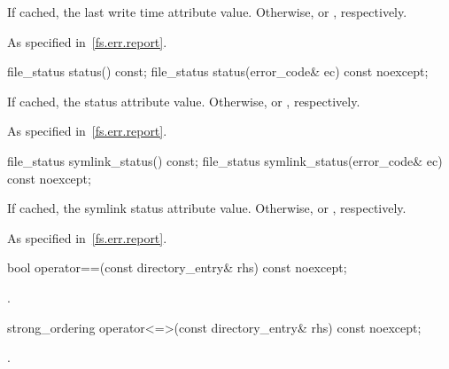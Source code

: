\begin{itemdescr}
\pnum
\returns
If cached, the last write time attribute value.
Otherwise,  or , respectively.

\pnum
\throws
As specified in~\ref{fs.err.report}.
\end{itemdescr}

%
\begin{itemdecl}
file_status status() const;
file_status status(error_code& ec) const noexcept;
\end{itemdecl}

\begin{itemdescr}
\pnum
\returns
If cached, the status attribute value.
Otherwise,  or , respectively.

\pnum
\throws
As specified in~\ref{fs.err.report}.
\end{itemdescr}

%
\begin{itemdecl}
file_status symlink_status() const;
file_status symlink_status(error_code& ec) const noexcept;
\end{itemdecl}

\begin{itemdescr}
\pnum
\returns
If cached, the symlink status attribute value.
Otherwise,  or , respectively.

\pnum
\throws
As specified in~\ref{fs.err.report}.
\end{itemdescr}

%
\begin{itemdecl}
bool operator==(const directory_entry& rhs) const noexcept;
\end{itemdecl}

\begin{itemdescr}
\pnum
\returns
{}.
\end{itemdescr}

%
\begin{itemdecl}
strong_ordering operator<=>(const directory_entry& rhs) const noexcept;
\end{itemdecl}

\begin{itemdescr}
\pnum
\returns
{}.
\end{itemdescr}

